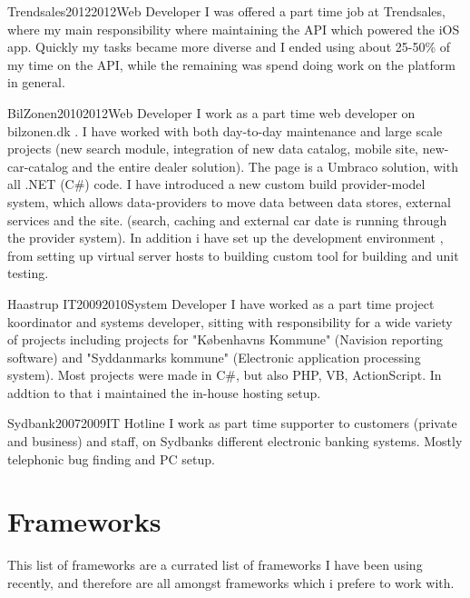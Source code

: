 \begin{cvexp}{Trendsales}{2012}{2012}{Web Developer}
	I was offered a part time job at Trendsales, where my main responsibility where maintaining the API which powered the iOS app. Quickly my tasks became more diverse and I ended using about 25-50\% of my time on the API, while the remaining was spend doing work on the platform in general.
\end{cvexp}

\begin{cvexp}{BilZonen}{2010}{2012}{Web Developer}
	I work as a part time web developer on bilzonen.dk . I have worked with both day-to-day maintenance and large scale projects (new search module, integration of new data catalog, mobile site, new-car-catalog and the entire dealer solution). The page is a Umbraco solution, with all .NET (C\#) code. I have introduced a new custom build provider-model system, which allows data-providers to move data between data stores, external services and the site. (search, caching and external car date is running through the provider system). In addition i have set up the development environment , from setting up virtual server hosts to building custom tool for building and unit testing.
\end{cvexp}

\begin{cvexp}{Haastrup IT}{2009}{2010}{System Developer}
	I have worked as a part time project koordinator and systems developer, sitting with responsibility for a wide variety of projects including projects for "Københavns Kommune" (Navision reporting software) and "Syddanmarks kommune" (Electronic application processing system). Most projects were made in C\#, but also PHP, VB, ActionScript. In addtion to that i maintained the in-house hosting setup.
\end{cvexp}

\begin{cvexp}{Sydbank}{2007}{2009}{IT Hotline}
	I work as part time supporter to customers (private and business) and staff, on Sydbanks different electronic banking systems. Mostly telephonic bug finding and PC setup.
\end{cvexp}

\section*{Frameworks}

This list of frameworks are a currated list of frameworks I have been using recently, and therefore are all amongst frameworks which i prefere to work with.\\


